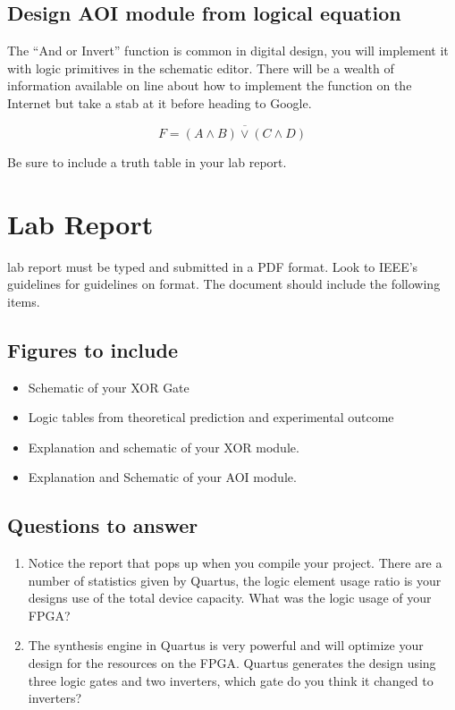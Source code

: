 \documentclass[12pt,journal]{IEEEtran}
\begin{document}
      \subsection{Design AOI module from logical equation} 
      The ``And or Invert'' function is common in digital design, you will implement it with logic primitives in the schematic editor. There will be a wealth of information available on line about how to implement the function on the Internet but take a stab at it before heading to Google. 

      \begin{displaymath}
        F = \overline{(A \wedge B) \vee (C \wedge D)}
      \end{displaymath}

      Be sure to include a truth table in your lab report.

  \section{Lab Report}
     lab report must be typed and submitted in a PDF format. Look to IEEE's guidelines for  guidelines on format. The document should include the following items.
    
    \subsection{Figures to include}
    \begin{itemize}
      \item Schematic of your XOR Gate
      \item Logic tables from theoretical prediction and experimental outcome
      \item Explanation and schematic of your XOR module.
      \item Explanation and Schematic of your AOI module.
    \end{itemize}

    \subsection{Questions to answer}
    \begin{enumerate}
      \item Notice the report that pops up when you compile your project. There are a number of statistics given by Quartus, the logic element usage ratio is your designs use of the total device capacity. What was the logic usage of your FPGA?
      \item The synthesis engine in Quartus is very powerful and will optimize your design for the resources on the   FPGA. Quartus generates the design using three logic gates and two inverters, which gate do you think it changed to inverters?
    \end{enumerate}
\end{document}
